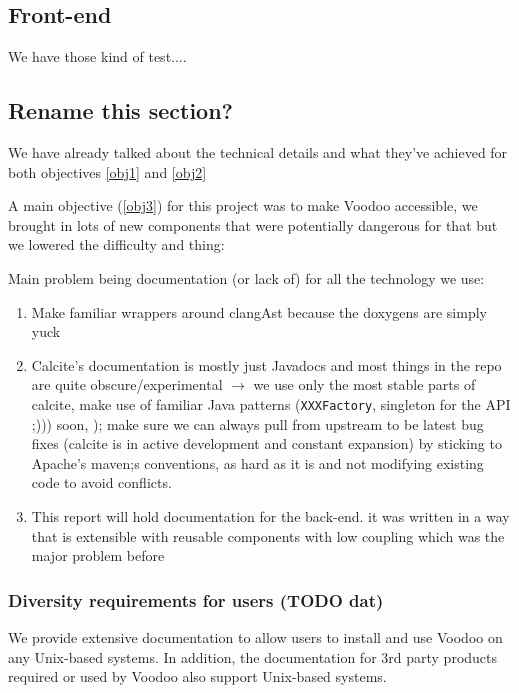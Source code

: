 \subsection{Front-end}

We have those kind of test....


\subsection{Rename this section?}

We have already talked about the technical details and what they've achieved for both objectives \ref{obj1} and \ref{obj2}

A main objective (\ref{obj3}) for this project was to make Voodoo accessible, we brought in lots of new components that were potentially dangerous for that but we lowered the difficulty and thing:

Main problem being documentation (or lack of) for all the technology we use:

\begin{enumerate}
    \item Make familiar wrappers around clangAst because the doxygens are simply yuck
    \item Calcite's documentation is mostly just Javadocs and most things in the repo are quite obscure/experimental $\rightarrow$ we use only the most stable parts of calcite, make use of familiar Java patterns (\texttt{XXXFactory}, singleton for the API ;))) soon, ); make sure we can always pull from upstream to be latest bug fixes (calcite is in active development and constant expansion) by sticking to Apache's maven;s conventions, as hard as it is and not modifying existing code to avoid conflicts.
    \item This report will hold documentation for the back-end. it was written in a way that is extensible with reusable components with low coupling which was the major problem before
\end{enumerate}

\subsubsection{Diversity requirements for users (TODO dat)}

We provide extensive documentation to allow users to install and use Voodoo on any Unix-based systems. In addition, the documentation for 3rd party products required or used by Voodoo also support Unix-based systems.

